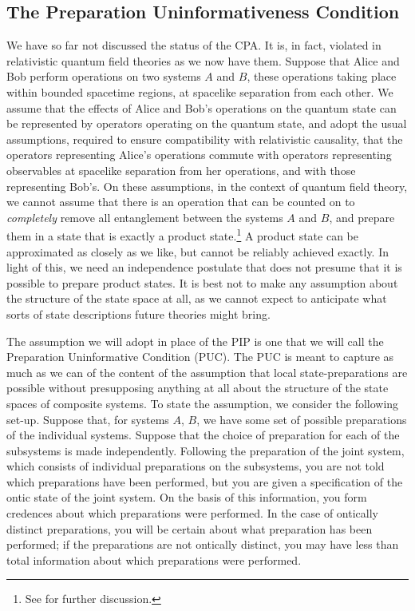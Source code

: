 \documentclass[12pt]{article}
\begin{document}
\subsection{The Preparation Uninformativeness Condition}
We have so far not discussed the status of the CPA. It is, in fact, violated in relativistic quantum field theories as we now have them.  Suppose that Alice and Bob perform operations on two systems $A$ and $B$, these operations taking place within bounded spacetime regions, at spacelike separation from each other. We assume that the effects of Alice and Bob's operations on the quantum state can be represented by operators operating on the quantum state, and  adopt the usual assumptions, required to ensure compatibility with relativistic causality,  that the operators representing Alice's operations commute  with  operators representing observables at spacelike separation from her operations, and with those representing Bob's.  On these assumptions, in the context of quantum field theory, we cannot assume that there is an operation that can be counted on to \emph{completely} remove all entanglement between the systems $A$ and $B$, and prepare them in a state that is exactly a product state.\footnote{See \citet{EntangOpenSystems} for further discussion.}  A product state can be approximated as closely as we like, but cannot be reliably achieved exactly.  In light of this, we need an independence postulate that does not presume that it is possible to prepare product states. It is best not to make any assumption about the structure of the state space at all, as we cannot expect to anticipate what sorts of state descriptions future theories might bring.

The assumption we will adopt in place of the PIP is one that we will call the Preparation Uninformative Condition (PUC). The PUC is meant to capture as much as we can of the content of the assumption that local state-preparations are possible  without presupposing anything at all about the structure of the state spaces of composite systems.  To state the assumption, we consider the following set-up.  Suppose that, for systems $A$, $B$, we have some set of possible preparations of the individual systems.  Suppose that the choice of preparation for each of the subsystems is made independently.  Following the preparation of the joint system, which consists of individual preparations on the subsystems, you are not told which preparations  have been  performed, but you are  given a specification of the ontic state of the joint system.  On the basis of this information, you form credences about which preparations were performed. In the case of ontically distinct preparations, you will be certain about what preparation has been performed; if the preparations are not ontically distinct, you may have less than total information about which preparations were performed.
\end{document}
